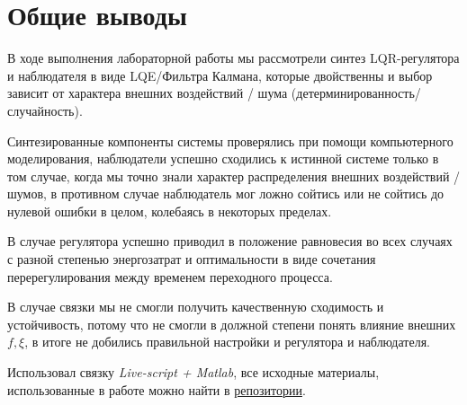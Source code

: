 \chapter{Общие выводы}
\label{ch:chap6}

В ходе выполнения лабораторной работы мы рассмотрели синтез LQR-регулятора и наблюдателя в виде LQE/Фильтра Калмана, которые двойственны и выбор зависит от характера внешних воздействий / шума (детерминированность/случайность).

Синтезированные компоненты системы проверялись при помощи компьютерного моделирования, наблюдатели успешно сходились к истинной системе только в том случае, когда мы точно знали характер распределения внешних воздействий / шумов, 
в противном случае наблюдатель мог ложно сойтись или не сойтись до нулевой ошибки в целом, колебаясь в некоторых пределах.

В случае регулятора успешно приводил в положение равновесия во всех случаях с разной степенью энергозатрат и оптимальности в виде сочетания перерегулирования между временем переходного процесса.

В случае связки  мы не смогли получить качественную сходимость и устойчивость, потому что не смогли в должной степени понять влияние внешних $f, \xi$, в итоге не добились правильной настройки и регулятора и наблюдателя.

Использовал связку \textit{Live-script + Matlab}, все исходные материалы, использованные в работе можно найти  в \href{https://github.com/GreedlyCore/control_theory_course}{репозитории}.

\endinput